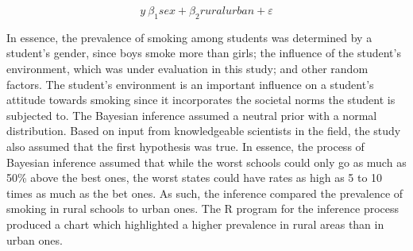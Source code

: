 \documentclass[
  12pt,
]{article}
\begin{document}
\[y ~ β_1 sex+β_2  rural urban+ \varepsilon\]

In essence, the prevalence of smoking among students was determined by a
student's gender, since boys smoke more than girls; the influence of the
student's environment, which was under evaluation in this study; and
other random factors. The student's environment is an important
influence on a student's attitude towards smoking since it incorporates
the societal norms the student is subjected to. The Bayesian inference
assumed a neutral prior with a normal distribution. Based on input from
knowledgeable scientists in the field, the study also assumed that the
first hypothesis was true. In essence, the process of Bayesian inference
assumed that while the worst schools could only go as much as 50\% above
the best ones, the worst states could have rates as high as 5 to 10
times as much as the bet ones. As such, the inference compared the
prevalence of smoking in rural schools to urban ones. The R program for
the inference process produced a chart which highlighted a higher
prevalence in rural areas than in urban ones.
\end{document}
